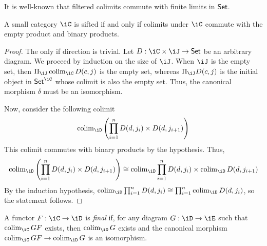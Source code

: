 \documentclass{zett}
\begin{document}
\begin{rmk}
  It is well-known that filtered colimits commute with finite limits in $\mathsf{Set}$.
\end{rmk}

\begin{lem}\label{lem:sifted-empty-binary}%
  A small category $\iC$ is sifted if and only if colimits under $\iC$ commute with the empty product and binary products.
\end{lem}
\begin{proof}
  The only if direction is trivial.
  Let $D : \iC \times \iJ \to \CSet$ be an arbitrary diagram.
  We proceed by induction on the size of $\iJ$.
  When $\iJ$ is the empty set, then $\Pi_{\iJ}\colim_{\iC}D(c,j)$ is the empty set, whereas $\Pi_{\iJ}D(c,j)$ is the initial object in $\CSet^{\iC}$ whose colimit is also the empty set.
  Thus, the canonical morphism $\delta$ must be an isomorphism.

  Now, consider the following colimit
  \[
    \colim_{\iD}\left(\prod_{i=1}^{n}D(d, j_{i}) \times D(d, j_{i+1})\right)
  \]
  This colimit commutes with binary products by the hypothesis.
  Thus,
  \[
    \colim_{\iD}\left(\prod_{i=1}^{n}D(d, j_{i}) \times D(d, j_{i+1})\right) \iso \colim_{\iD}\prod_{i=1}^{n}D(d, j_{i}) \times \colim_{\iD}D(d, j_{i+1})
  \]
  By the induction hypothesis, $\colim_{\iD}\prod_{i=1}^{n}D(d, j_{i}) \iso \prod_{i=1}^{n}\colim_{\iD}D(d, j_{i})$, so the statement follows.
\end{proof}

\begin{defn}
  A functor $F : \iC \to \iD$ is \emph{final} if, for any diagram $G : \iD \to \iE$ such that $\colim_{\iC}GF$ exists, then $\colim_{\iD}G$ exists and the canonical morphism $\colim_{\iC}GF \to \colim_{\iD}G$ is an isomorphism.
\end{defn}
\end{document}
